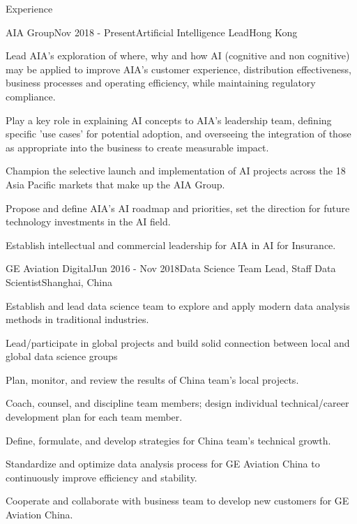 \documentclass{resume} %
\begin{document}
\begin{rSection}{Experience}

\begin{rSubsection}{AIA Group}{Nov 2018 - Present}{Artificial Intelligence Lead}{Hong Kong}
\item Lead AIA's exploration of where, why and how AI (cognitive and non cognitive) may be applied to improve AIA's customer experience, distribution effectiveness, business processes and operating efficiency, while maintaining regulatory compliance.
\item Play a key role in explaining AI concepts to AIA's leadership team, defining specific 'use cases' for potential adoption, and overseeing the integration of those as appropriate into the business to create measurable impact.
\item Champion the selective launch and implementation of AI projects across the 18 Asia Pacific markets that make up the AIA Group.
\item Propose and define AIA's AI roadmap and priorities, set the direction for future technology investments in the AI field.
\item Establish intellectual and commercial leadership for AIA in AI for Insurance.
\end{rSubsection}


\begin{rSubsection}{GE Aviation Digital}{Jun 2016 - Nov 2018}{Data Science Team Lead, Staff Data Scientist}{Shanghai, China}
\item Establish and lead data science team to explore and apply modern data analysis methods in traditional industries.
\item Lead/participate in global projects and build solid connection between local and global data science groups
\item Plan, monitor, and review the results of China team's local projects.
\item Coach, counsel, and discipline team members; design individual technical/career development plan for each team member.
\item Define, formulate, and develop strategies for China team's technical growth.
\item Standardize and optimize data analysis process for GE Aviation China to continuously improve efficiency and stability.
\item Cooperate and collaborate with business team to develop new customers for GE Aviation China.
\end{rSubsection}


\end{rSection}
\end{document}
